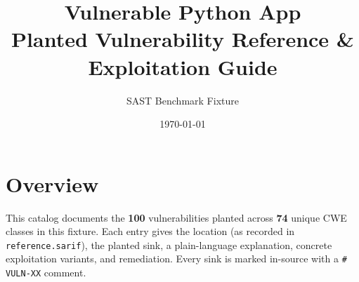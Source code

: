 \documentclass[11pt,a4paper]{article}
\title{\textbf{Vulnerable Python App}\\[4pt]\large Planted Vulnerability Reference \& Exploitation Guide}
\author{SAST Benchmark Fixture}
\date{\today}
\begin{document}
\maketitle
\begin{center}\end{center}
\vspace{6pt}
\tableofcontents
\newpage
\section{Overview}
This catalog documents the \textbf{100} vulnerabilities planted across \textbf{74} unique CWE classes in this fixture. Each entry gives the location (as recorded in \texttt{reference.sarif}), the planted sink, a plain-language explanation, concrete exploitation variants, and remediation. Every sink is marked in-source with a \texttt{\# VULN-XX} comment.
\end{document}
